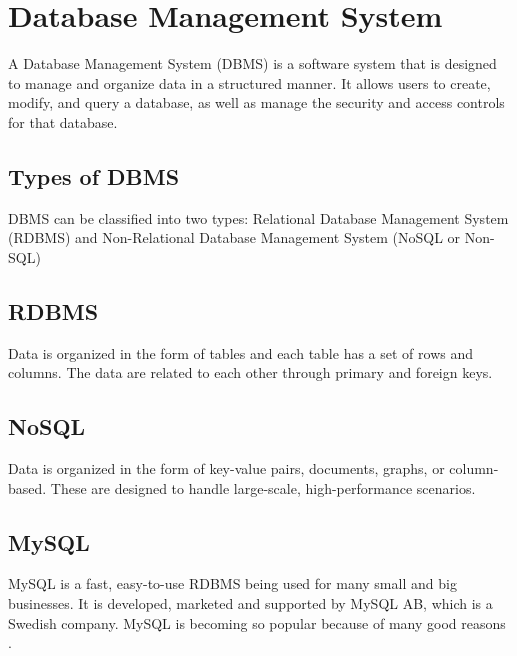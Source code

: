 \documentclass[12pt]{report}
\begin{document}
\section{Database Management System}
A Database Management System (DBMS) is a software system that is designed to manage and organize data in a structured manner. It allows users to create, modify, and query a database, as well as manage the security and access controls for that database\cite{geekforgeeks_dbms}.

\subsection{Types of DBMS}
DBMS can be classified into two types: 
Relational Database Management System (RDBMS) and Non-Relational Database Management System (NoSQL or Non-SQL)
\subsection{RDBMS} 
Data is organized in the form of tables and each table has a set of rows and columns. The data are related to each other through primary and foreign keys.
\subsection{NoSQL} 
Data is organized in the form of key-value pairs, documents, graphs, or column-based. These are designed to handle large-scale, high-performance scenarios.

\subsection{MySQL}
MySQL is a fast, easy-to-use RDBMS being used for many small and big businesses. It is developed, marketed and supported by MySQL AB, which is a Swedish company. MySQL is becoming so popular because of many good reasons \cite{tutorialspoint_mysql}.
\end{document}
